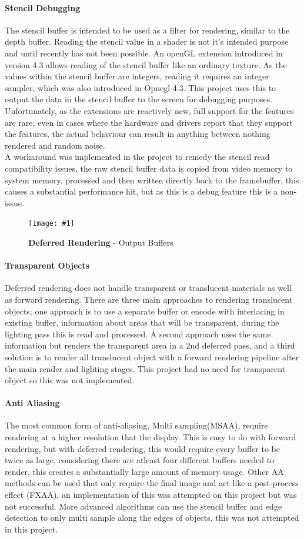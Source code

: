 \documentclass[conference]{acmsiggraph}
\newcommand{\figuremacroF}[4]{
	\begin{figure}[h] %
		\centering
		\texttt{[image: \#1]}
		\caption[#2]{\textbf{#2} - #3}
		\label{fig:#1}
	\end{figure}
}
\begin{document}
\paragraph{Stencil Debugging}
The stencil buffer is intended to be used as a filter for rendering, similar to the depth buffer. Reading the stencil value in a shader is not it's intended purpose and until recently has not been possible. An openGL extension introduced in version 4.3 allows reading of the stencil buffer like an ordinary texture. As the values within the stencil buffer are integers, reading it requires an integer sampler, which was also introduced in Opnegl 4.3. This project uses this to output the data in the stencil buffer to the screen for debugging purposes. Unfortunately, as the extensions are reactively new, full support for the features are rare, even in cases where the hardware and drivers report that they support the features, the actual behaviour can result in anything between nothing rendered and random noise.\\
A workaround was implemented in the project to remedy the stencil read compatibility issues, the raw stencil buffer data is copied from video memory to system memory, processed and then written directly back to the framebuffer, this causes a substantial performance hit, but as this is a debug feature this is a non-issue.

\figuremacroF
{buffers}
{Deferred Rendering}
{Output Buffers}
{1.0}

\paragraph{Transparent Objects}
Deferred rendering does not handle transparent or translucent materials as well as forward rendering. There are three main approaches to rendering translucent objects; one approach is to use a separate buffer or encode with interlacing in existing buffer, information about areas that will be transparent, during the lighting pass this is read and processed. A second approach uses the same information but renders the transparent area in a 2nd deferred pass, and a third solution is to render all translucent object with a forward rendering pipeline after the main render and lighting stages. This project had no need for transparent object so this was not implemented.

\paragraph{Anti Aliasing}
The most common form of anti-aliasing, Multi sampling(MSAA), require rendering at a higher resolution that the display. This is easy to do with forward rendering, but with deferred rendering, this would require every buffer to be twice as large, considering there are atleast four different buffers needed to render, this creates a substantially large amount of memory usage. Other AA methods can be used that only require the final image and act like a post-process effect (FXAA), an implementation of this was attempted on this project but was not successful.
More advanced algorithms can use the stencil buffer and edge detection to only multi sample along the edges of objects, this was not attempted in this project.
\end{document}
